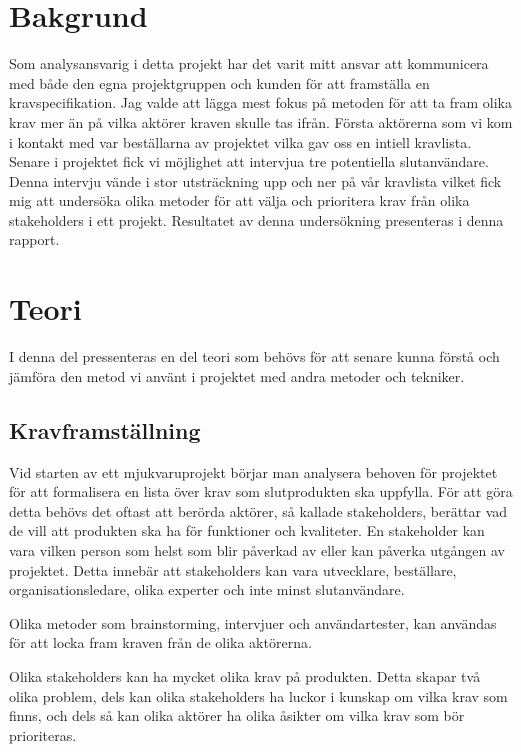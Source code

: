 \section{Bakgrund}
Som analysansvarig i detta projekt har det varit mitt ansvar att kommunicera med både den egna projektgruppen och kunden för att framställa en kravspecifikation. Jag valde att lägga mest fokus på metoden för att ta fram olika krav mer än på vilka aktörer kraven skulle tas ifrån. Första aktörerna som vi kom i kontakt med var beställarna av projektet vilka gav oss en intiell kravlista. Senare i projektet fick vi möjlighet att intervjua tre potentiella slutanvändare. Denna intervju vände i stor utsträckning upp och ner på vår kravlista vilket fick mig att undersöka olika metoder för att välja och prioritera krav från olika stakeholders i ett projekt. Resultatet av denna undersökning presenteras i denna rapport.  

\section{Teori}
I denna del pressenteras en del teori som behövs för att senare kunna förstå och jämföra den metod vi använt i projektet med andra metoder och tekniker.

\subsection{Kravframställning}
Vid starten av ett mjukvaruprojekt börjar man analysera behoven för projektet för att formalisera en lista över krav som slutprodukten ska uppfylla. För att göra detta behövs det oftast att berörda aktörer, så kallade stakeholders, berättar vad de vill att produkten ska ha för funktioner och kvaliteter. En stakeholder kan vara vilken person som helst som blir påverkad av eller kan påverka utgången av projektet. Detta innebär att stakeholders kan vara  utvecklare, beställare, organisationsledare, olika experter och inte minst slutanvändare. 

Olika metoder som brainstorming, intervjuer och användartester, kan användas för att locka fram kraven från de olika aktörerna.

Olika stakeholders kan ha mycket olika krav på produkten. Detta skapar två olika problem, dels kan olika stakeholders ha luckor i kunskap om vilka krav som finns, och dels så kan olika aktörer ha olika åsikter om vilka krav som bör prioriteras. 

